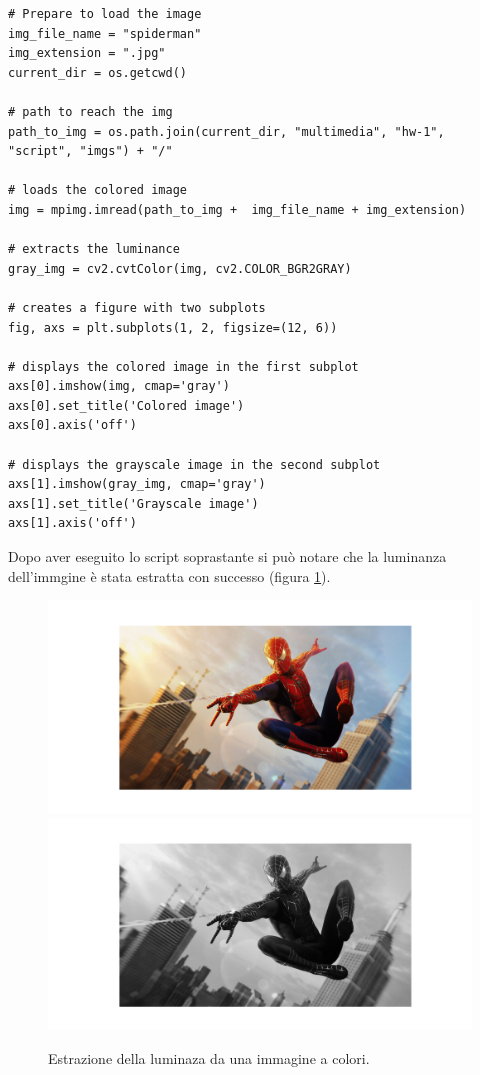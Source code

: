 \begin{lstlisting}
# Prepare to load the image
img_file_name = "spiderman"
img_extension = ".jpg"
current_dir = os.getcwd()

# path to reach the img
path_to_img = os.path.join(current_dir, "multimedia", "hw-1", "script", "imgs") + "/"

# loads the colored image
img = mpimg.imread(path_to_img +  img_file_name + img_extension) 

# extracts the luminance
gray_img = cv2.cvtColor(img, cv2.COLOR_BGR2GRAY)

# creates a figure with two subplots
fig, axs = plt.subplots(1, 2, figsize=(12, 6))

# displays the colored image in the first subplot
axs[0].imshow(img, cmap='gray')
axs[0].set_title('Colored image')
axs[0].axis('off')

# displays the grayscale image in the second subplot
axs[1].imshow(gray_img, cmap='gray')
axs[1].set_title('Grayscale image')
axs[1].axis('off')
\end{lstlisting}

\noindent Dopo aver eseguito lo script soprastante si può notare che la luminanza dell'immgine è stata estratta con successo (figura \ref{fig:colored-grayscale}).

\begin{figure}[h]
    \centering
    \includegraphics[width = .7\textwidth]{hw-1/report/imgs/colored.png}
    \includegraphics[width = .7\textwidth]{hw-1/report/imgs/grayscale.png}
    \caption{Estrazione della luminaza da una immagine a colori.}
    \label{fig:colored-grayscale}
\end{figure}

